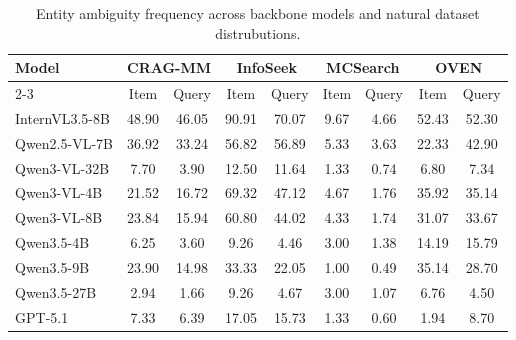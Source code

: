 \documentclass{article} %
\begin{document}
\begin{table}[htbp]
    \centering
    \setlength{\tabcolsep}{3pt}
    \caption{Entity ambiguity frequency across backbone models and natural dataset distrubutions.}
    \begin{tabular}{l c c c c c c c c}
    \hline
    \textbf{Model} & \multicolumn{2}{c}{\textbf{CRAG-MM}} & \multicolumn{2}{c}{\textbf{InfoSeek}} & \multicolumn{2}{c}{\textbf{MCSearch}} & \multicolumn{2}{c}{\textbf{OVEN}} \\
    \cline{2-3} \cline{4-5} \cline{6-7} \cline{8-9}
    & Item & Query & Item & Query & Item & Query & Item & Query \\
    \midrule
    InternVL3.5-8B & 48.90 & 46.05 & 90.91 & 70.07 & 9.67 & 4.66 & 52.43 & 52.30 \\
    Qwen2.5-VL-7B & 36.92 & 33.24 & 56.82 & 56.89 & 5.33 & 3.63 & 22.33 & 42.90 \\
    Qwen3-VL-32B & 7.70 & 3.90 & 12.50 & 11.64 & 1.33 & 0.74 & 6.80 & 7.34 \\
    Qwen3-VL-4B & 21.52 & 16.72 & 69.32 & 47.12 & 4.67 & 1.76 & 35.92 & 35.14 \\
    Qwen3-VL-8B & 23.84 & 15.94 & 60.80 & 44.02 & 4.33 & 1.74 & 31.07 & 33.67 \\
    Qwen3.5-4B  & 6.25 & 3.60 & 9.26 & 4.46 & 3.00 & 1.38 & 14.19 & 15.79 \\
    Qwen3.5-9B  & 23.90 & 14.98 & 33.33 & 22.05 & 1.00 & 0.49 & 35.14 & 28.70 \\
    Qwen3.5-27B  & 2.94 & 1.66 & 9.26 & 4.67 & 3.00 & 1.07 & 6.76 & 4.50 \\
    GPT-5.1 & 7.33 & 6.39 & 17.05 & 15.73 & 1.33 & 0.60 & 1.94 & 8.70 \\
    \midrule
    \end{tabular}
    \label{tab:ambiguity_frequency_source}
\end{table}
\end{document}
